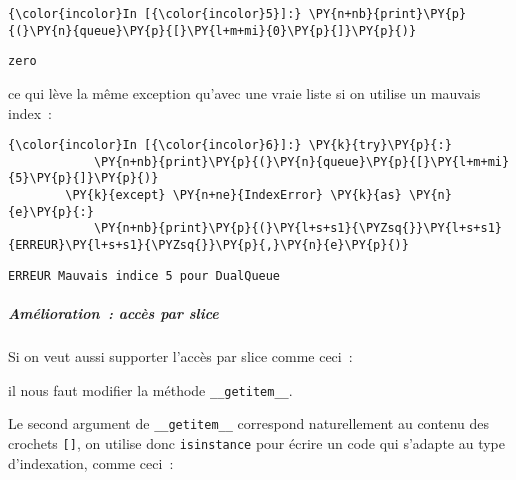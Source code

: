     \begin{Verbatim}[commandchars=\\\{\},frame=single,framerule=0.3mm,rulecolor=\color{cellframecolor}]
{\color{incolor}In [{\color{incolor}5}]:} \PY{n+nb}{print}\PY{p}{(}\PY{n}{queue}\PY{p}{[}\PY{l+m+mi}{0}\PY{p}{]}\PY{p}{)}
\end{Verbatim}


    \begin{Verbatim}[commandchars=\\\{\},frame=single,framerule=0.3mm,rulecolor=\color{cellframecolor}]
zero
\end{Verbatim}

    ce qui lève la même exception qu'avec une vraie liste si on utilise un
mauvais index~:

    \begin{Verbatim}[commandchars=\\\{\},frame=single,framerule=0.3mm,rulecolor=\color{cellframecolor}]
{\color{incolor}In [{\color{incolor}6}]:} \PY{k}{try}\PY{p}{:}
            \PY{n+nb}{print}\PY{p}{(}\PY{n}{queue}\PY{p}{[}\PY{l+m+mi}{5}\PY{p}{]}\PY{p}{)}
        \PY{k}{except} \PY{n+ne}{IndexError} \PY{k}{as} \PY{n}{e}\PY{p}{:}
            \PY{n+nb}{print}\PY{p}{(}\PY{l+s+s1}{\PYZsq{}}\PY{l+s+s1}{ERREUR}\PY{l+s+s1}{\PYZsq{}}\PY{p}{,}\PY{n}{e}\PY{p}{)}
\end{Verbatim}


    \begin{Verbatim}[commandchars=\\\{\},frame=single,framerule=0.3mm,rulecolor=\color{cellframecolor}]
ERREUR Mauvais indice 5 pour DualQueue
\end{Verbatim}

    \hypertarget{amuxe9lioration-accuxe8s-par-slice}{%
\subparagraph{Amélioration~: accès par
slice}\label{amuxe9lioration-accuxe8s-par-slice}}

    Si on veut aussi supporter l'accès par slice comme ceci~:

\begin{Shaded}
\begin{Highlighting}[frame=lines,framerule=0.6mm,rulecolor=\color{asisframecolor}]
\NormalTok{queue[}\NormalTok{:}\NormalTok{]}
\end{Highlighting}
\end{Shaded}

il nous faut modifier la méthode \texttt{\_\_getitem\_\_}.

    Le second argument de \texttt{\_\_getitem\_\_} correspond naturellement
au contenu des crochets \texttt{{[}{]}}, on utilise donc
\texttt{isinstance} pour écrire un code qui s'adapte au type
d'indexation, comme ceci~:


